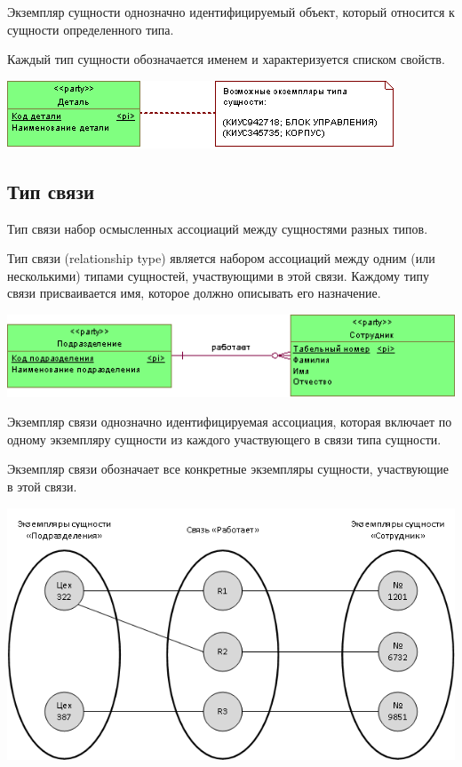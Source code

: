\documentclass{beamer}
\begin{document}
\begin{frame}
\begin{block}{Экземпляр сущности}
однозначно идентифицируемый объект, который относится к сущности определенного типа.
\end{block}
Каждый тип сущности обозначается именем и характеризуется списком свойств. 
\begin{center}
\includegraphics[scale=1.0]{images/entity-type.png}
\end{center}
\end{frame}

\subsection{Тип связи}
\begin{frame}
\begin{block}{Тип связи}
набор осмысленных ассоциаций между сущностями разных типов.
\end{block}
Тип связи (relationship type) является набором ассоциаций между одним (или
несколькими) типами сущностей, участвующими в этой связи. Каждому типу связи присваивается имя, которое должно описывать его назначение. 
\begin{center}
\includegraphics[scale=0.8]{images/relation-01.png}
\end{center}
\end{frame}

\begin{frame}
\begin{block}{Экземпляр связи}
однозначно идентифицируемая ассоциация, которая включает по одному экземпляру сущности из каждого участвующего в связи типа сущности.
\end{block}
Экземпляр связи обозначает все конкретные экземпляры сущности, участвующие в этой связи.
\begin{center}
\includegraphics[scale=0.5]{images/relation-02.png}
\end{center}
\end{frame}
\end{document}
